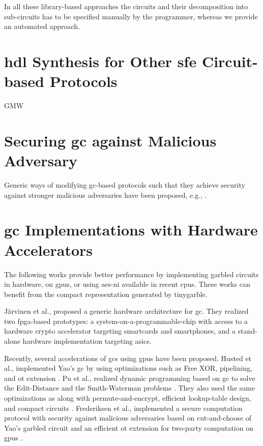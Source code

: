 In all these library-based approaches the circuits and their decomposition into sub-circuits has to be specified manually by the programmer, whereas we provide an automated approach.

\section{\acrshort{hdl} Synthesis for Other \acrshort{sfe} Circuit-based Protocols} \label{sec:related-hdl}
GMW

\section{Securing \acrshort{gc} against Malicious Adversary}\label{sec:related-malicious}
Generic ways of modifying \acrshort{gc}-based protocols such that they achieve security against stronger malicious adversaries have been proposed, e.g., \cite{lindell2007efficient, lindell2012secure, nielsen2009lego}.

\section{\acrshort{gc} Implementations with Hardware Accelerators} \label{sec:related-hardware}
The following works provide better performance by implementing garbled circuits in hardware, on \acrshort{gpu}s, or using \acrshort{aes-ni} available in recent \acrshort{cpu}s.
These works can benefit from the compact representation generated by \gls{tinygarble}.

J\"arvinen et al., \cite{jarvinen2010garbled} proposed a generic hardware architecture for \acrshort{gc}.
They realized two \acrshort{fpga}-based prototypes: a system-on-a-programmable-chip with access to a hardware crypto accelerator targeting smartcards and smartphones, and a stand-alone hardware implementation targeting \acrshort{asic}s.

Recently, several accelerations of \acrshort{gc}s using \acrshort{gpu}s have been proposed.
Husted et al., implemented Yao's \acrshort{gc} by using optimizations such as Free XOR, pipelining, and \acrshort{ot} extension \cite{husted2013gpu}.
Pu et al., realized dynamic programming based on \acrshort{gc} to solve the Edit-Distance and the Smith-Waterman problems \cite{pu2013computing}.
They also used the same optimizations as \cite{husted2013gpu} along with permute-and-encrypt, efficient lookup-table design, and compact circuits \cite{pu2013computing}.
Frederiksen et al., implemented a secure computation protocol with security against malicious adversaries based on cut-and-choose of Yao's garbled circuit and an efficient \acrshort{ot} extension for two-party computation on \acrshort{gpu}s \cite{frederiksen2013fast}.

